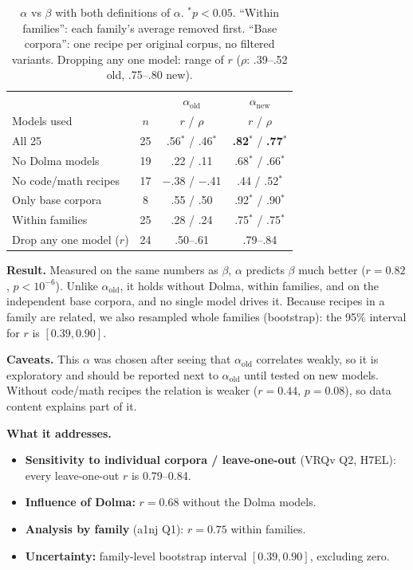 \begin{table}[h]
\centering\small
\begin{tabular}{lccc}
\hline
 & & $\alpha_{\mathrm{old}}$ & $\alpha_{\mathrm{new}}$ \\
Models used & $n$ & $r$ / $\rho$ & $r$ / $\rho$ \\
\hline
All 25 & 25 & .56$^{*}$ / .46$^{*}$ & \textbf{.82}$^{*}$ / \textbf{.77}$^{*}$ \\
No Dolma models & 19 & .22 / .11 & .68$^{*}$ / .66$^{*}$ \\
No code/math recipes & 17 & $-$.38 / $-$.41 & .44 / .52$^{*}$ \\
Only base corpora & 8 & .55 / .50 & .92$^{*}$ / .90$^{*}$ \\
Within families & 25 & .28 / .24 & .75$^{*}$ / .75$^{*}$ \\
Drop any one model ($r$) & 24 & .50--.61 & .79--.84 \\
\hline
\end{tabular}
\caption{$\alpha$ vs $\beta$ with both definitions of $\alpha$. $^{*}p<0.05$. ``Within families'':
each family's average removed first. ``Base corpora'': one recipe per original corpus, no
filtered variants. Dropping any one model: range of $r$ ($\rho$: .39--.52 old, .75--.80 new).}
\label{tab:exp3}
\end{table}

\textbf{Result.} Measured on the same numbers as $\beta$, $\alpha$ predicts $\beta$ much better
($r = 0.82$, $p < 10^{-6}$). Unlike $\alpha_{\mathrm{old}}$, it holds without Dolma, within families, and
on the independent base corpora, and no single model drives it. Because recipes in a family are
related, we also resampled whole families (bootstrap): the 95\% interval for $r$ is $[0.39, 0.90]$.

\textbf{Caveats.} This $\alpha$ was chosen after seeing that $\alpha_{\mathrm{old}}$ correlates weakly,
so it is exploratory and should be reported next to $\alpha_{\mathrm{old}}$ until tested on new
models. Without code/math recipes the relation is weaker ($r = 0.44$, $p = 0.08$), so data content
explains part of it.

\textbf{What it addresses.}
\begin{itemize}
\item \textbf{Sensitivity to individual corpora / leave-one-out} (VRQv Q2, H7EL): every leave-one-out
  $r$ is 0.79--0.84.
\item \textbf{Influence of Dolma:} $r = 0.68$ without the Dolma models.
\item \textbf{Analysis by family} (a1nj Q1): $r = 0.75$ within families.
\item \textbf{Uncertainty:} family-level bootstrap interval $[0.39, 0.90]$, excluding zero.
\end{itemize}
